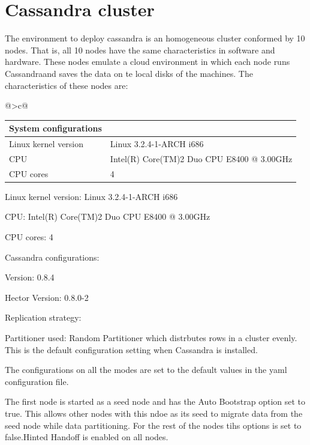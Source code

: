 \section{Cassandra cluster} \label{sexp:CassandraCluster}

The environment to deploy cassandra is  an homogeneous cluster conformed by 10
nodes. That is, all 10 nodes have the same characteristics in software and
hardware. These nodes emulate a cloud environment in which each node runs
Cassandraand saves the data on te local disks of the machines. The
characteristics of these nodes are:

	\begin{table} \label{texp:Nodeconfig}
	\centering
	\newcolumntype{C} {@{\hspace{2.5pt}}>{\scriptsize}c@{\hspace{2.5pt}}}
		\begin{tabular}{CC}
			\toprule
			\bfseries System configurations\\
			\midrule
			Linux kernel version & Linux 3.2.4-1-ARCH i686 \\
			\rc CPU & Intel(R) Core(TM)2 Duo CPU     E8400  @ 3.00GHz \\
			CPU cores & 4  \\
			\bottomrule
		\end{tabular}
	\end{table}



Linux kernel version: Linux 3.2.4-1-ARCH i686

CPU: Intel(R) Core(TM)2 Duo CPU     E8400  @ 3.00GHz

CPU cores: 4



Cassandra configurations:

Version: 0.8.4

Hector Version: 0.8.0-2

Replication strategy:

Partitioner used: Random Partitioner which distrbutes rows in a cluster evenly.
This is the default configuration setting when Cassandra is installed.

The configurations on all the modes are set to the default values in the yaml
configuration file.

The first node is started as a seed node and has the Auto Bootstrap option set
to true. This allows other nodes with this ndoe as its seed to migrate data from
the seed node while data partitioning. For the rest of the nodes tihs options is
set to false.Hinted Handoff is enabled on all nodes.

